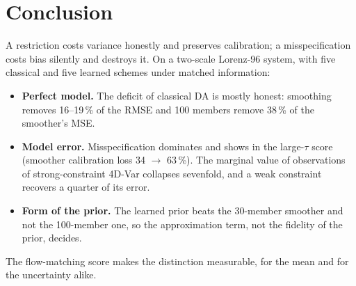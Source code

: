 \section{Conclusion}\label{sec:conclusion}
A restriction costs variance honestly and preserves calibration; a
misspecification costs bias silently and destroys it. On a two-scale Lorenz-96
system, with five classical and five learned schemes under matched information:
\begin{itemize}[leftmargin=*,nosep]
  \item \textbf{Perfect model.} The deficit of classical DA is mostly honest:
    smoothing removes 16--19\,\% of the RMSE and 100 members remove 38\,\% of the
    smoother's MSE.
  \item \textbf{Model error.} Misspecification dominates and shows in the
    large-$\tau$ score (smoother calibration loss 34 $\to$ 63\,\%). The marginal
    value of observations of strong-constraint 4D-Var collapses sevenfold, and a
    weak constraint recovers a quarter of its error.
  \item \textbf{Form of the prior.} The learned prior beats the 30-member smoother
    and not the 100-member one, so the approximation term, not the fidelity of
    the prior, decides.
\end{itemize}
The flow-matching score makes the distinction measurable, for the mean and for
the uncertainty alike.
